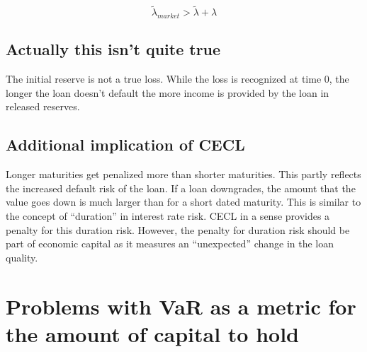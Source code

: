 \documentclass{article}
\begin{document}
\[\tilde{\lambda}_{market} > \tilde{\lambda}+\lambda\]

\subsection{Actually this isn't quite true}

The initial reserve is not a true loss.  While the loss is recognized at time \(0\), the longer the loan doesn't default the more income is provided by the loan in released reserves.  

\subsection{Additional implication of CECL}

Longer maturities get penalized more than shorter maturities.  This partly reflects the increased default risk of the loan.  If a loan downgrades, the amount that the value goes down is much larger than for a short dated maturity.  This is similar to the concept of ``duration'' in interest rate risk.  CECL in a sense provides a penalty for this duration risk.  However, the penalty for duration risk should be part of economic capital as it measures an ``unexpected'' change in the loan quality.

\section{Problems with VaR as a metric for the amount of capital to hold}
\end{document}

